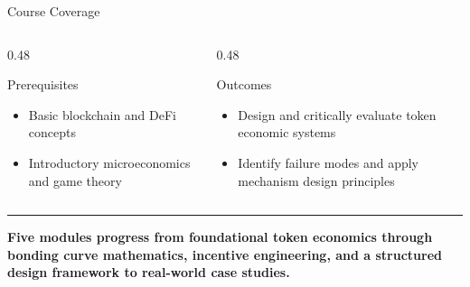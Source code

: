 \documentclass[8pt,aspectratio=169]{beamer}
\newcommand{\bottomnote}[1]{\vfill\vspace{-2mm}\textcolor{mllavender2}{\rule{\textwidth}{0.4pt}}\vspace{1mm}\footnotesize\textbf{#1}}
\begin{document}
\begin{frame}{Course Coverage}
\begin{center}
\end{center}
\vspace{4mm}
\begin{columns}[T]
\begin{column}{0.48\textwidth}
\begin{block}{Prerequisites}
\begin{itemize}\setlength\itemsep{2pt}
  \item[\small$\checkmark$] \small Basic blockchain and DeFi concepts
  \item[\small$\checkmark$] \small Introductory microeconomics and game theory
\end{itemize}
\end{block}
\end{column}
\begin{column}{0.48\textwidth}
\begin{block}{Outcomes}
\begin{itemize}\setlength\itemsep{2pt}
  \item[\small$\checkmark$] \small Design and critically evaluate token economic systems
  \item[\small$\checkmark$] \small Identify failure modes and apply mechanism design principles
\end{itemize}
\end{block}
\end{column}
\end{columns}
\bottomnote{Five modules progress from foundational token economics through bonding curve mathematics, incentive engineering, and a structured design framework to real-world case studies.}
\end{frame}
\end{document}
